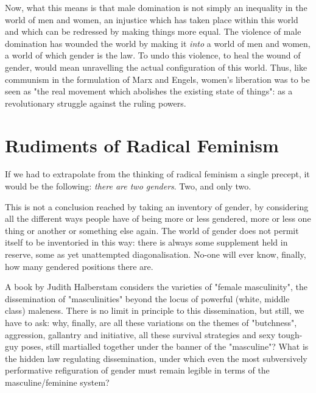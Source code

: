 \documentclass[ebook]{memoir}
\begin{document}
Now, what this means is that male domination is not simply an inequality in the world of men and women, an injustice which has taken place within this world and which can be redressed by making things more equal. The violence of male domination has wounded the world by making it \emph{into} a world of men and women, a world of which gender is the law. To undo this violence, to heal the wound of gender, would mean unravelling the actual configuration of this world. Thus, like communism in the formulation of Marx and Engels, women's liberation was to be seen as "the real movement which abolishes the existing state of things": as a revolutionary struggle against the ruling powers.

\section{Rudiments of Radical Feminism}

If we had to extrapolate from the thinking of radical feminism a single precept, it would be the following: \emph{there are two genders}. Two, and only two.

This is not a conclusion reached by taking an inventory of gender, by considering all the different ways people have of being more or less gendered, more or less one thing or another or something else again. The world of gender does not permit itself to be inventoried in this way: there is always some supplement held in reserve, some as yet unattempted diagonalisation. No-one will ever know, finally, how many gendered positions there are.

A book by Judith Halberstam considers the varieties of "female masculinity", the dissemination of "masculinities" beyond the locus of powerful (white, middle class) maleness. There is no limit in principle to this dissemination, but still, we have to ask: why, finally, are all these variations on the themes of "butchness", aggression, gallantry and initiative, all these survival strategies and sexy tough-guy poses, still martialled together under the banner of the "masculine"? What is the hidden law regulating dissemination, under which even the most subversively performative refiguration of gender must remain legible in terms of the masculine/feminine system?
\end{document}
